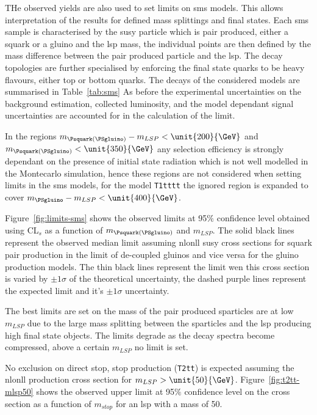 THe observed yields are also used to set limits on \ac{sms} models. This allows interpretation of the results for defined mass splittings and final states. Each \ac{sms} sample is characterised by the \ac{susy} particle which is pair produced, either a squark or a gluino and the \ac{lsp} mass, the individual points are then defined by the mass difference between the pair produced particle and the \ac{lsp}.
The decay topologies are further specialised by enforcing the final state quarks to be heavy flavours, either top or bottom quarks. The decays of the considered models are summarised in Table~\ref{tab:sms}
As before the experimental uncertainties on the background estimation, collected luminosity, and the model dependant signal uncertainties are accounted for in the calculation of the limit.

In the regions $m_{\Psquark(\PSgluino)} - m_{LSP} < \unit{200}{\GeV}$ and $m_{\Psquark(\PSgluino)} < \unit{350}{\GeV}$ any selection efficiency is strongly dependant on the presence of initial state radiation which is not well modelled in the Montecarlo simulation, hence these regions are not considered when setting limits in the \ac{sms} models, for the model \texttt{T1tttt} the ignored region is expanded to cover $m_{\PSgluino} - m_{LSP} < \unit{400}{\GeV}$.

Figure~\ref{fig:limits-sms} shows the observed limits at 95$\%$ confidence level obtained using CL$_{s}$ as a function of $m_{\Psquark(\PSgluino)}$ and $m_{LSP}$. The solid black lines represent the observed median limit assuming \ac{nlonll}\cite{Beenakker:1996ch,susy-nlo-nll} \ac{susy} cross sections for squark pair production in the limit of de-coupled gluinos and vice versa for the gluino production models. The thin black lines represent the limit wen this cross section is varied by $\pm1\sigma$ of the theoretical uncertainty, the dashed purple lines represent the expected limit and it's $\pm1\sigma$ uncertainty.

The best limits are set on the mass of the pair produced sparticles are at low $m_{LSP}$ due to the large mass splitting between the sparticles and the \ac{lsp} producing high \pt final state objects. The limits degrade as the decay spectra become compressed, above a certain $m_{LSP}$ no limit is set.

No exclusion on direct stop, stop production (\texttt{T2tt}) is expected assuming the \ac{nlonll} production cross section for $m_{LSP} > \unit{50}{\GeV}$. Figure~\ref{fig:t2tt-mlsp50} shows the observed upper limit at 95$\%$ confidence level on the cross section as a function of $m_{stop}$ for an \ac{lsp} with a mass of \unit{50}{\GeV}.



